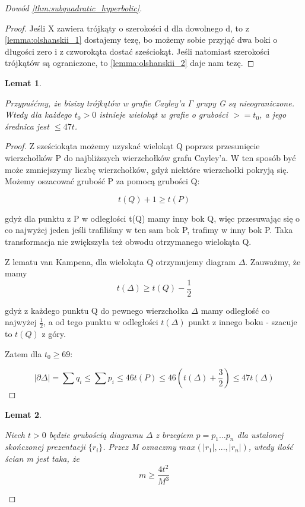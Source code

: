 \documentclass[licencjacka]{pracamgr}
\newtheorem{lemma}{Lemat}[section]
\begin{document}
\begin{proof}[Dowód \ref{thm:subquadratic_hyperbolic}]
\begin{proof}
Jeśli X zawiera trójkąty o szerokości d dla dowolnego d, to z \ref{lemma:olshanskii_1} dostajemy tezę, bo możemy sobie przyjąć dwa boki o długości zero i z czworokąta dostać sześciokąt. Jeśli natomiast szerokości trójkątów są ograniczone, to \ref{lemma:olshanskii_2} daje nam tezę.

\end{proof}

\begin{lemma}\label{lemma:olshanskii_4}

Przypuśćmy, że bisizy trójkątów w grafie Cayley'a $\Gamma$ grupy G są nieograniczone. Wtedy dla każdego $t_{0} > 0$ istnieje wielokąt w grafie o grubości $>= t_{0}$, a jego średnica jest $\leq 47t$.

\end{lemma}

\begin{proof}

Z sześciokąta możemy uzyskać wielokąt Q poprzez przesunięcie wierzchołków P do najbliższych wierzchołków grafu Cayley'a. W ten sposób być może zmniejszymy liczbę wierzchołków, gdyż niektóre wierzchołki pokryją się. Możemy oszacować grubość P za pomocą grubości Q:

\[ t(Q) + 1 \geq t(P) \]

gdyż dla punktu z P w odległości t(Q) mamy inny bok Q, więc przesuwając się o co najwyżej jeden jeśli trafiliśmy w ten sam bok P, trafimy w inny bok P. Taka transformacja nie zwiększyła też obwodu otrzymanego wielokąta Q.

Z lematu van Kampena, dla wielokąta Q otrzymujemy diagram $\Delta$. Zauważmy, że mamy
\[ t(\Delta) \geq t(Q) - \frac{1}{2} \]

gdyż z każdego punktu Q do pewnego wierzchołka $\Delta$ mamy odległość co najwyżej $\frac{1}{2}$, a od tego punktu w odległości $t(\Delta)$ punkt z innego boku - szacuje to $t(Q)$ z góry.

Zatem dla $t_{0} \geq 69$:

\[ |\partial \Delta| = \sum q_{i} \leq \sum p_{i} \leq 46t(P) \leq 46(t(\Delta) + \frac{3}{2}) \leq 47 t(\Delta) \]

\end{proof}

\begin{lemma}\label{lemma:olshanskii_5}

Niech $t > 0$ będzie grubością diagramu $\Delta$ z brzegiem $p=p_{1}...p_{n}$ dla ustalonej skończonej prezentacji $\{ r_{i} \}$. Przez M oznaczmy $max(|r_{1}|, ..., |r_{n}|)$, wtedy ilość ścian m jest taka, że
\[ m \geq \frac{4t^2}{M^3} \]


\end{lemma}
\end{proof}
\end{document}
